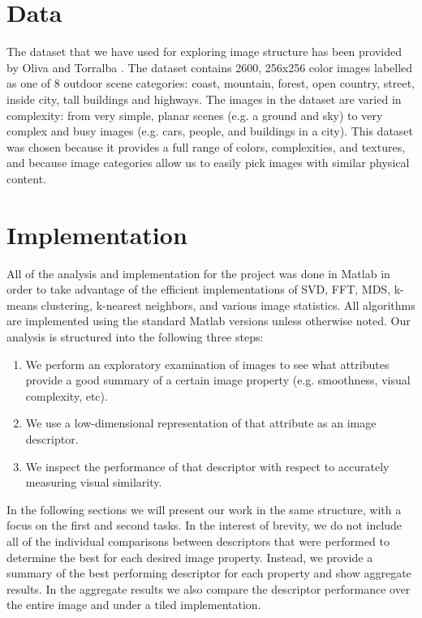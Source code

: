 \documentclass{report}
\begin{document}
\section{Data}
The dataset that we have used for exploring image structure has been provided by Oliva and Torralba \cite{gist_descriptor}. The dataset contains 2600, 256x256 color images labelled as one of 8 outdoor scene categories: coast, mountain, forest, open country, street, inside city, tall buildings and highways. The images in the dataset are varied in complexity: from very simple, planar scenes (e.g. a ground and sky) to very complex and busy images (e.g. cars, people, and buildings in a city). This dataset was chosen because it provides a full range of colors, complexities, and textures, and because image categories allow us to easily pick images with similar physical content.

\section{Implementation}
All of the analysis and implementation for the project was done in Matlab in order to take advantage of the efficient implementations of SVD, FFT, MDS, k-means clustering, k-nearest neighbors, and various image statistics. All algorithms are implemented using the standard Matlab versions unless otherwise noted. Our analysis is structured into the following three steps:
\begin{enumerate}
  \item We perform an exploratory examination of images to see what attributes provide a good summary of a certain image property (e.g. smoothness, visual complexity, etc).
  \item We use a low-dimensional representation of that attribute as an image descriptor.
  \item We inspect the performance of that descriptor with respect to accurately measuring visual similarity.
\end{enumerate}
In the following sections we will present our work in the same structure, with a focus on the first and second tasks. In the interest of brevity, we do not include all of the individual comparisons between descriptors that were performed to determine the best for each desired image property. Instead, we provide a summary of the best performing descriptor for each property and show aggregate results. In the aggregate results we also compare the descriptor performance over the entire image and under a tiled implementation.
\end{document}
